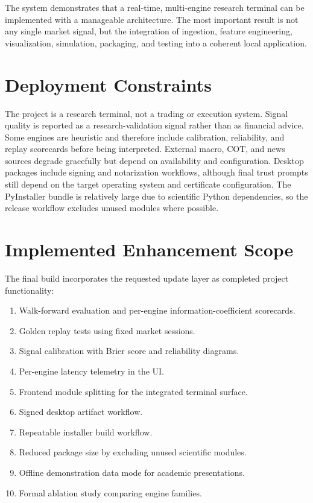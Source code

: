\documentclass[conference]{IEEEtran}
\begin{document}
The system demonstrates that a real-time, multi-engine research terminal can
be implemented with a manageable architecture. The most important result is
not any single market signal, but the integration of ingestion, feature
engineering, visualization, simulation, packaging, and testing into a
coherent local application.

\section{Deployment Constraints}

The project is a research terminal, not a trading or execution system. Signal
quality is reported as a research-validation signal rather than as financial
advice. Some engines are heuristic and therefore include calibration,
reliability, and replay scorecards before being interpreted. External macro,
COT, and news sources degrade gracefully but depend on availability and
configuration. Desktop packages include signing and notarization workflows,
although final trust prompts still depend on the target operating system and
certificate configuration. The PyInstaller bundle is relatively large due to
scientific Python dependencies, so the release workflow excludes unused
modules where possible.

\section{Implemented Enhancement Scope}

The final build incorporates the requested update layer as completed project
functionality:
\begin{enumerate}
  \item Walk-forward evaluation and per-engine information-coefficient
  scorecards.
  \item Golden replay tests using fixed market sessions.
  \item Signal calibration with Brier score and reliability diagrams.
  \item Per-engine latency telemetry in the UI.
  \item Frontend module splitting for the integrated terminal surface.
  \item Signed desktop artifact workflow.
  \item Repeatable installer build workflow.
  \item Reduced package size by excluding unused scientific modules.
  \item Offline demonstration data mode for academic presentations.
  \item Formal ablation study comparing engine families.
\end{enumerate}
\end{document}
